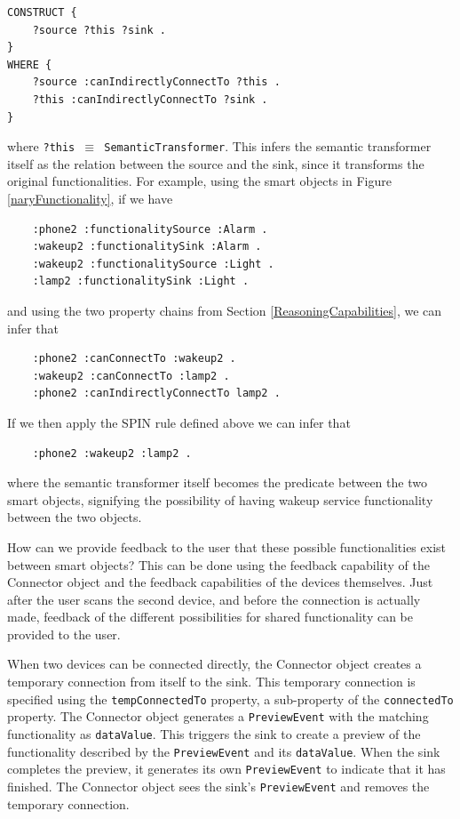 \begin{verbatim}
CONSTRUCT {
    ?source ?this ?sink .
}
WHERE {
    ?source :canIndirectlyConnectTo ?this .
    ?this :canIndirectlyConnectTo ?sink .
}
\end{verbatim}

where \texttt{?this \ensuremath{\equiv} SemanticTransformer}. This infers the semantic transformer itself as the relation between the source and the sink, since it transforms the original functionalities. For example, using the smart objects in Figure \ref{naryFunctionality}, if we have 

\begin{verbatim}
	:phone2 :functionalitySource :Alarm .
	:wakeup2 :functionalitySink :Alarm .
	:wakeup2 :functionalitySource :Light .
	:lamp2 :functionalitySink :Light .
\end{verbatim}

and using the two property chains from Section \ref{ReasoningCapabilities}, we can infer that

\begin{verbatim}
	:phone2 :canConnectTo :wakeup2 .
	:wakeup2 :canConnectTo :lamp2 .
	:phone2 :canIndirectlyConnectTo lamp2 .
\end{verbatim}

If we then apply the \ac{SPIN} rule defined above we can infer that 

\begin{verbatim}
	:phone2 :wakeup2 :lamp2 .
\end{verbatim}

where the semantic transformer itself becomes the predicate between the two smart objects, signifying the possibility of having wakeup service functionality between the two objects.


How can we provide feedback to the user that these possible functionalities exist between smart objects? This can be done using the feedback capability of the Connector object and the feedback capabilities of the devices themselves. Just after the user scans the second device, and before the connection is actually made, feedback of the different possibilities for shared functionality can be provided to the user. 

When two devices can be connected directly, the Connector object creates a temporary connection from itself to the sink. This temporary connection is specified using the \texttt{tempConnectedTo} property, a sub-property of the \texttt{connectedTo} property. The Connector object generates a \texttt{PreviewEvent} with the matching functionality as \texttt{dataValue}. This triggers the sink to create a preview of the functionality described by the \texttt{PreviewEvent} and its \texttt{dataValue}.  When the sink completes the preview, it generates its own \texttt{PreviewEvent} to indicate that it has finished. The Connector object sees the sink's \texttt{PreviewEvent} and removes the temporary connection. 

